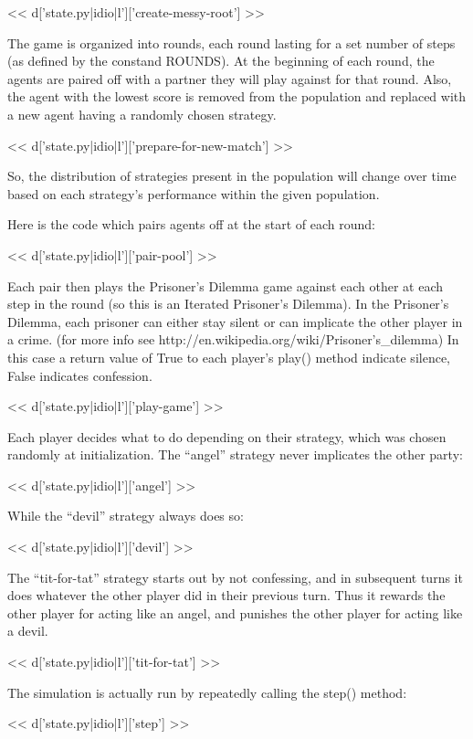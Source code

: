 \documentclass[custom, plainsections]{sciposter}
\begin{document}
\begin{multicols*}{2}
\tiny
<< d['state.py|idio|l']['create-messy-root'] >>
\small

The game is organized into rounds, each round lasting for a set number of steps (as defined by the constand ROUNDS). At the beginning of each round, the agents are paired off with a partner they will play against for that round. Also, the agent with the lowest score is removed from the population and replaced with a new agent having a randomly chosen strategy.

\tiny
<< d['state.py|idio|l']['prepare-for-new-match'] >>
\small

So, the distribution of strategies present in the population will change over time based on each strategy's performance within the given population.

Here is the code which pairs agents off at the start of each round:

\tiny
<< d['state.py|idio|l']['pair-pool'] >>
\small

Each pair then plays the Prisoner's Dilemma game against each other at each step in the round (so this is an Iterated Prisoner's Dilemma). In the Prisoner's Dilemma, each prisoner can either stay silent or can implicate the other player in a crime. (for more info see http://en.wikipedia.org/wiki/Prisoner's\_dilemma) In this case a return value of True to each player's play() method indicate silence, False indicates confession.

\tiny
<< d['state.py|idio|l']['play-game'] >>
\small

Each player decides what to do depending on their strategy, which was chosen randomly at initialization. The ``angel'' strategy never implicates the other party:

\tiny
<< d['state.py|idio|l']['angel'] >>
\small

While the ``devil'' strategy always does so:

\tiny
<< d['state.py|idio|l']['devil'] >>
\small

The ``tit-for-tat'' strategy starts out by not confessing, and in subsequent turns it does whatever the other player did in their previous turn. Thus it rewards the other player for acting like an angel, and punishes the other player for acting like a devil.

\tiny
<< d['state.py|idio|l']['tit-for-tat'] >>
\small

The simulation is actually run by repeatedly calling the step() method:

\tiny
<< d['state.py|idio|l']['step'] >>
\small


\end{multicols*}
\end{document}
